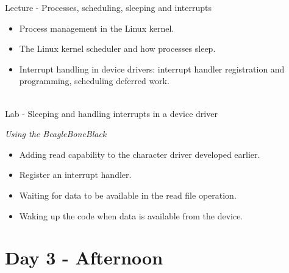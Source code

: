 \documentclass[a4paper,12pt,obeyspaces,spaces,hyphens]{article}
\begin{document}
\feagendaonecolumn
{Lecture - Processes, scheduling, sleeping and interrupts}
{
  \begin{itemize}
  \item Process management in the Linux kernel.
  \item The Linux kernel scheduler and how processes sleep.
  \item Interrupt handling in device drivers: interrupt handler
    registration and programming, scheduling deferred work.
  \end{itemize}
}
\\
\feagendaonecolumn
{Lab - Sleeping and handling interrupts in a device driver}
{
  {\em Using the BeagleBoneBlack}
  \begin{itemize}
  \item Adding read capability to the character driver developed
    earlier.
  \item Register an interrupt handler.
  \item Waiting for data to be available in the read file operation.
  \item Waking up the code when data is available from the device.
  \end{itemize}
}

\section{Day 3 - Afternoon}
\end{document}
